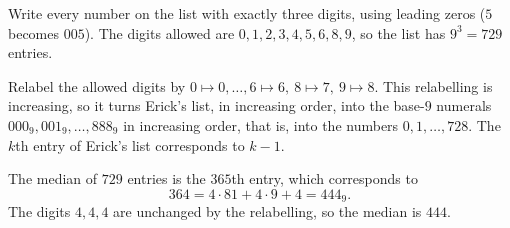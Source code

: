 Write every number on the list with exactly three digits, using leading zeros ($5$ becomes $005$). The digits allowed are $0,1,2,3,4,5,6,8,9$, so the list has $9^3=729$ entries.

Relabel the allowed digits by $0\mapsto0,\dots,6\mapsto6,\ 8\mapsto7,\ 9\mapsto8$. This relabelling is increasing, so it turns Erick's list, in increasing order, into the base-$9$ numerals $000_9,001_9,\dots,888_9$ in increasing order, that is, into the numbers $0,1,\dots,728$. The $k$th entry of Erick's list corresponds to $k-1$.

The median of $729$ entries is the $365$th entry, which corresponds to
\[
364=4\cdot81+4\cdot9+4=444_9 .
\]
The digits $4,4,4$ are unchanged by the relabelling, so the median is $\boxed{444}$.

